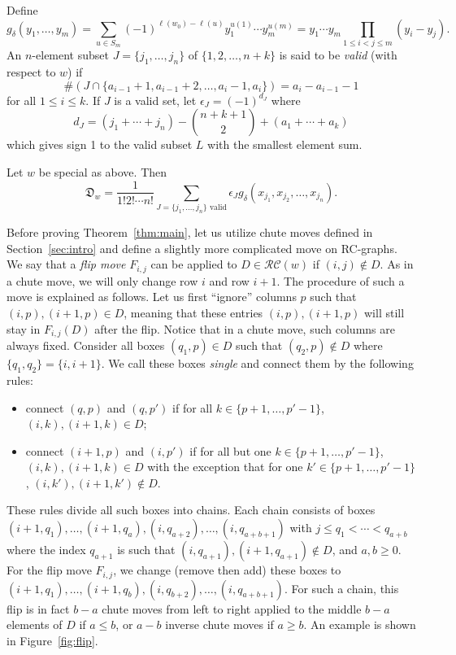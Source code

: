 \documentclass[10pt]{amsart}
\newcommand{\D}{\mathfrak{D}}
\newcommand{\RC}{\mathcal{RC}}
\begin{document}
Define
\[
g_{\delta}(y_1,\ldots,y_m)=\sum_{u\in S_m}(-1)^{\ell(w_0)-\ell(u)}y_1^{u(1)}\cdots y_m^{u(m)}=y_1\cdots y_m\prod_{1\leq i<j\leq m}(y_i-y_j).
\]
An $n$-element subset $J=\{j_1,\ldots,j_n\}$ of $\{1,2,\ldots,n+k\}$ is said to be \emph{valid} (with respect to $w$) if
\[
\#(J\cap\{a_{i-1}+1,a_{i-1}+2,\ldots,a_i-1,a_i\})=a_i-a_{i-1}-1
\]
for all $1\leq i\leq k$. If $J$ is a valid set, let $\epsilon_J=(-1)^{d_J}$ where
\[
d_J=(j_1+\cdots+j_n)-\binom{n+k+1}{2}+(a_1+\cdots+a_k)
\]
which gives sign 1 to the valid subset $L$ with the smallest element sum.
\begin{theorem}\label{thm:main}
Let $w$ be special as above. Then
\[
\D_w=\frac{1}{1!2!\cdots n!}\sum_{J=\{j_1,\ldots,j_n\}\text{ valid}}\epsilon_J g_{\delta}(x_{j_1},x_{j_2},\ldots,x_{j_n}).
\]
\end{theorem}
Before proving Theorem~\ref{thm:main}, let us utilize chute moves defined in Section~\ref{sec:intro} and define a slightly more complicated move on RC-graphs. We say that a \emph{flip move} $F_{i,j}$ can be applied to $D\in\RC(w)$ if $(i,j)\notin D$. As in a chute move, we will only change row $i$ and row $i+1$. The procedure of such a move is explained as follows. Let us first ``ignore'' columns $p$ such that $(i,p),(i+1,p)\in D$, meaning that these entries $(i,p),(i+1,p)$ will still stay in $F_{i,j}(D)$ after the flip. Notice that in a chute move, such columns are always fixed. Consider all boxes $(q_1,p)\in D$ such that $(q_2,p)\notin D$ where $\{q_1,q_2\}=\{i,i+1\}$. We call these boxes \emph{single} and connect them by the following rules:
\begin{itemize}
\item connect $(q,p)$ and $(q,p')$ if for all $k\in \{p+1,\ldots,p'-1\}$, $(i,k),(i+1,k)\in D$;
\item connect $(i+1,p)$ and $(i,p')$ if for all but one $k\in\{p+1,\ldots,p'-1\}$, $(i,k),(i+1,k)\in D$ with the exception that for one $k'\in \{p+1,\ldots,p'-1\}$, $(i,k'),(i+1,k')\notin D$.
\end{itemize}
These rules divide all such boxes into chains. Each chain consists of boxes $(i+1,q_1),\ldots,(i+1,q_a),(i,q_{a+2}),\ldots,(i,q_{a+b+1})$ with $j\leq q_1<\cdots<q_{a+b}$ where the index $q_{a+1}$ is such that $(i,q_{a+1}),(i+1,q_{a+1})\notin D$, and $a,b\geq0$. For the flip move $F_{i,j}$, we change (remove then add) these boxes to $(i+1,q_1),\ldots,(i+1,q_b),(i,q_{b+2}),\ldots,(i,q_{a+b+1}).$ For such a chain, this flip is in fact $b-a$ chute moves from left to right applied to the middle $b-a$ elements of $D$ if $a\leq b$, or $a-b$ inverse chute moves if $a\geq b$. An example is shown in Figure~\ref{fig:flip}.
\end{document}
